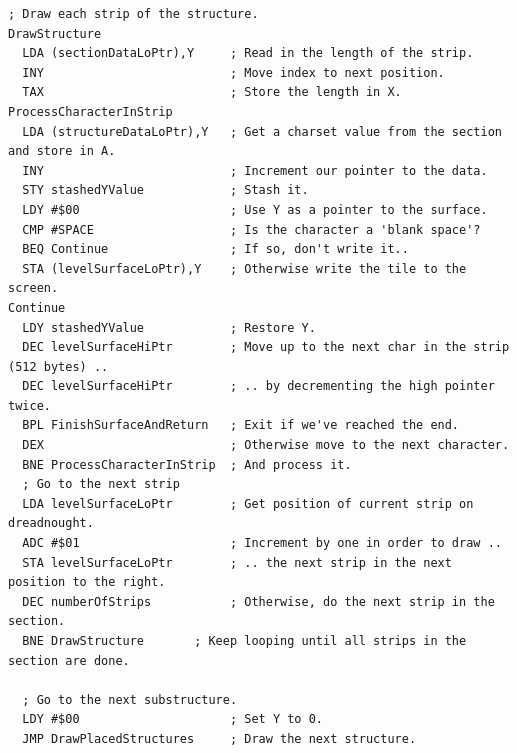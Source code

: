 \begin{lstlisting}[basicstyle=\scriptsize\ttfamily]
  ; Draw each strip of the structure.
DrawStructure   
  LDA (sectionDataLoPtr),Y     ; Read in the length of the strip.
  INY                          ; Move index to next position.
  TAX                          ; Store the length in X.
ProcessCharacterInStrip   
  LDA (structureDataLoPtr),Y   ; Get a charset value from the section and store in A.
  INY                          ; Increment our pointer to the data.
  STY stashedYValue            ; Stash it.
  LDY #$00                     ; Use Y as a pointer to the surface. 
  CMP #SPACE                   ; Is the character a 'blank space'?
  BEQ Continue                 ; If so, don't write it..
  STA (levelSurfaceLoPtr),Y    ; Otherwise write the tile to the screen.
Continue   
  LDY stashedYValue            ; Restore Y.
  DEC levelSurfaceHiPtr        ; Move up to the next char in the strip (512 bytes) ..
  DEC levelSurfaceHiPtr        ; .. by decrementing the high pointer twice.
  BPL FinishSurfaceAndReturn   ; Exit if we've reached the end.
  DEX                          ; Otherwise move to the next character.
  BNE ProcessCharacterInStrip  ; And process it.
  ; Go to the next strip
  LDA levelSurfaceLoPtr        ; Get position of current strip on dreadnought.
  ADC #$01                     ; Increment by one in order to draw ..
  STA levelSurfaceLoPtr        ; .. the next strip in the next position to the right.
  DEC numberOfStrips           ; Otherwise, do the next strip in the section.
  BNE DrawStructure       ; Keep looping until all strips in the section are done.

  ; Go to the next substructure.
  LDY #$00                     ; Set Y to 0.
  JMP DrawPlacedStructures     ; Draw the next structure.
\end{lstlisting}

